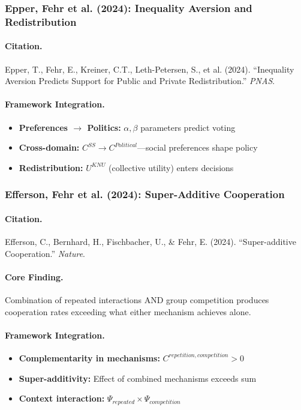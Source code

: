 \subsubsection{Epper, Fehr et al. (2024): Inequality Aversion and Redistribution}

\paragraph{Citation.}
Epper, T., Fehr, E., Kreiner, C.T., Leth-Petersen, S., et al. (2024).
``Inequality Aversion Predicts Support for Public and Private Redistribution.''
\emph{PNAS}.

\paragraph{Framework Integration.}
\begin{itemize}
  \item \textbf{Preferences $\to$ Politics:} $\alpha, \beta$ parameters predict voting
  \item \textbf{Cross-domain:} $C^{SS} \to C^{Political}$---social preferences shape policy
  \item \textbf{Redistribution:} $U^{KNU}$ (collective utility) enters decisions
\end{itemize}

\subsubsection{Efferson, Fehr et al. (2024): Super-Additive Cooperation}

\paragraph{Citation.}
Efferson, C., Bernhard, H., Fischbacher, U., \& Fehr, E. (2024).
``Super-additive Cooperation.'' \emph{Nature}.

\paragraph{Core Finding.}
Combination of repeated interactions AND group competition produces
cooperation rates exceeding what either mechanism achieves alone.

\paragraph{Framework Integration.}
\begin{itemize}
  \item \textbf{Complementarity in mechanisms:} $C^{repetition, competition} > 0$
  \item \textbf{Super-additivity:} Effect of combined mechanisms exceeds sum
  \item \textbf{Context interaction:} $\Psi_{repeated} \times \Psi_{competition}$
\end{itemize}

